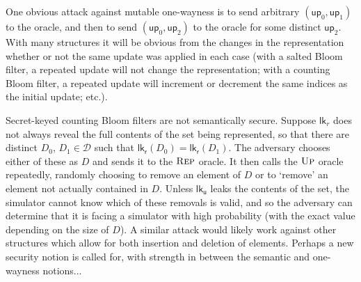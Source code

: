 \documentclass[11pt, pdftex]{article}
\begin{document}
One obvious attack against mutable one-wayness is to send arbitrary $(\mathsf{up}_0,\mathsf{up}_1)$ to the oracle, and then to send $(\mathsf{up}_0,\mathsf{up}_2)$ to the oracle for some distinct $\mathsf{up}_2$. With many structures it will be obvious from the changes in the representation whether or not the same update was applied in each case (with a salted Bloom filter, a repeated update will not change the representation; with a counting Bloom filter, a repeated update will increment or decrement the same indices as the initial update; etc.).

Secret-keyed counting Bloom filters are not semantically secure. Suppose $\mathsf{lk}_r$ does not always reveal the full contents of the set being represented, so that there are distinct $D_0$, $D_1 \in \mathcal{D}$ such that $\mathsf{lk_r}(D_0) = \mathsf{lk_r}(D_1)$. The adversary chooses either of these as $D$ and sends it to the $\textsc{Rep}$ oracle. It then calls the $\textsc{Up}$ oracle repeatedly, randomly choosing to remove an element of $D$ or to `remove' an element not actually contained in $D$. Unless $\mathsf{lk_u}$ leaks the contents of the set, the simulator cannot know which of these removals is valid, and so the adversary can determine that it is facing a simulator with high probability (with the exact value depending on the size of $D$). A similar attack would likely work against other structures which allow for both insertion and deletion of elements. Perhaps a new security notion is called for, with strength in between the semantic and one-wayness notions...


\end{document}
